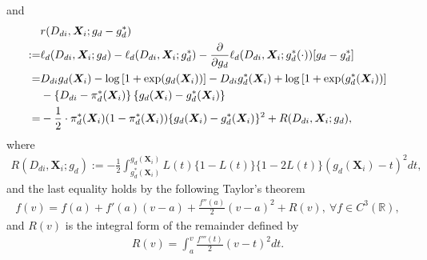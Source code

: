 \documentclass[11pt]{article}
\numberwithin{equation}{section}
\begin{document}
and
\begin{align}\label{def:r}
	&r(D_{di},\boldsymbol{X}_{i};g_d-g^*_d)\\
	:=&\ell_d(D_{di},\boldsymbol{X}_{i};g_d)-\ell_d(D_{di},\boldsymbol{X}_{i};g^*_d)-\frac{\partial}{\partial g_d}\ell_d(D_{di},\boldsymbol{X}_{i};g^*_d(\cdot))[g_d-g^*_d]\notag\\
	=&D_{di}g_d(\boldsymbol{X}_i)-\log\left[1+\exp(g_d(\boldsymbol{X}_i))\right]-D_{di}g^*_d(\boldsymbol{X}_i)+\log\left[1+\exp(g^*_d(\boldsymbol{X}_i))\right]\notag\\
	&-\left\{D_{di}-\pi^*_d(\boldsymbol{X}_i)\right\} \{g_d(\boldsymbol{X}_{i})-g^*_d(\boldsymbol{X}_{i}) \}\notag\\
	=&-\frac{1}{2}\cdot\pi_d^*(\boldsymbol{X}_i)(1-\pi_d^*(\boldsymbol{X}_i))\{g_d(\boldsymbol{X}_{i})-g^*_d(\boldsymbol{X}_{i}) \}^2+R(D_{di},\boldsymbol{X}_{i};g_d),\notag
\end{align}
where
\begin{align*}
	R(D_{di},\boldsymbol{X}_{i};g_d):=-\frac{1}{2}\int_{g_d^*(\boldsymbol{X}_i)}^{g_d(\boldsymbol{X}_i)}L(t)\{1-L(t)\}\{1-2L(t)\}(g_d(\boldsymbol{X}_i)-t)^2dt,
\end{align*}
and the last equality holds by the following Taylor's theorem
\begin{align*}
	f(v)=f(a)+f'(a)(v-a)+\frac{f''(a)}{2}(v-a)^2+R(v), \ \forall f\in C^3(\mathbb{R}),
\end{align*}
and $R(v)$ is the integral form of the remainder defined by
\begin{align*}
	R(v)=\int_a^v \frac{f'''(t)}{2}(v-t)^2dt.
\end{align*}
\end{document}
